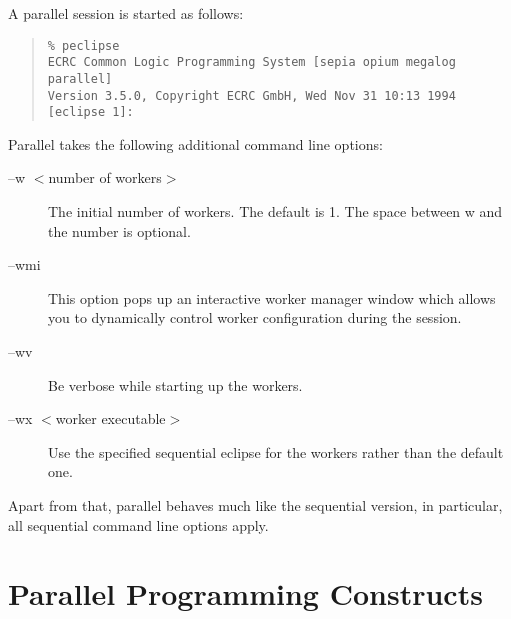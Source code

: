 A parallel session is started as follows:
\begin{quote}\begin{verbatim}
% peclipse
ECRC Common Logic Programming System [sepia opium megalog parallel]
Version 3.5.0, Copyright ECRC GmbH, Wed Nov 31 10:13 1994
[eclipse 1]: 
\end{verbatim}\end{quote}
Parallel {\eclipse} takes the following additional command line options:
\begin{description}
\item[--w $<$number of workers$>$] The initial number of workers.
The default is 1. The space between w and the number is optional.
\item[--wmi] 
This option pops up an interactive worker manager window which allows 
you to dynamically control worker configuration during the session. 
\item[--wv] Be verbose while starting up the workers.
\item[--wx $<$worker executable$>$]
Use the specified sequential eclipse for the workers rather
than the default one.
\end{description}
Apart from that, parallel {\eclipse} behaves much like the sequential
version, in particular, all sequential command line options apply.

\section{Parallel Programming Constructs}
